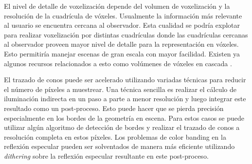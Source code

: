 El nivel de detalle de voxelización depende del volumen de voxelización y la resolución de la cuadrícula de vóxeles. Usualmente la información más relevante al usuario se encuentra cercana al observador. Esta cualidad se podría explotar para realizar voxelización por distintas cuadrículas donde las cuadrículas cercanas al observador proveen mayor nivel de detalle para la representación en vóxeles. Esto permitiría manejar escenas de gran escala con mayor facilidad. Existen ya algunos recursos relacionados a esto como volúmenes de vóxeles en cascada \cite{McLaren:2015:TCL:2775280.2792546}.

El trazado de conos puede ser acelerado utilizando variadas técnicas para reducir el número de píxeles a muestrear. Una técnica sencilla es realizar el cálculo de iluminación indirecta en un paso a parte a menor resolución y luego integrar este resultado como un post-proceso. Esto puede hacer que se pierda precisión especialmente en los bordes de la geometría en escena. Para estos casos se puede utilizar algún algoritmo de detección de bordes y realizar el trazado de conos a resolución completa en estos píxeles. Los problemas de color banding en la reflexión especular pueden ser solventados de manera más eficiente utilizando \emph{dithering} sobre la reflexión especular resultante en este post-proceso.
